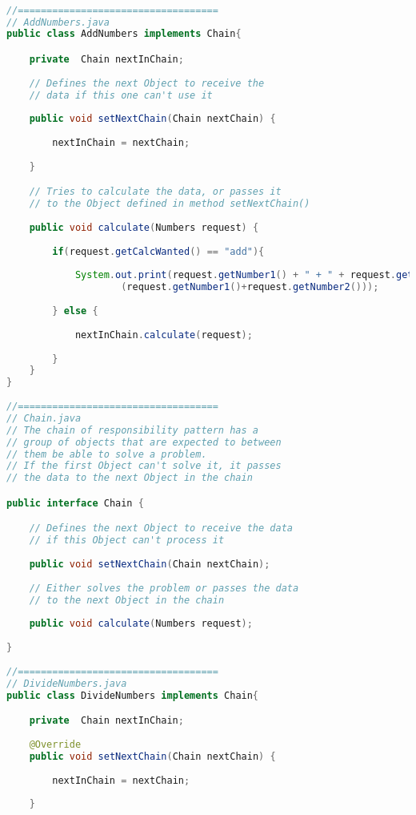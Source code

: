 \documentclass[10pt , a4paper]{article}
\begin{document}
\small
\begin{lstlisting}[language=java]

//===================================
// AddNumbers.java
public class AddNumbers implements Chain{

	private  Chain nextInChain;
	
	// Defines the next Object to receive the
	// data if this one can't use it
	
	public void setNextChain(Chain nextChain) {
		
		nextInChain = nextChain;
		
	}

	// Tries to calculate the data, or passes it
	// to the Object defined in method setNextChain()
	
	public void calculate(Numbers request) {
		
		if(request.getCalcWanted() == "add"){
			
			System.out.print(request.getNumber1() + " + " + request.getNumber2() + " = "+
					(request.getNumber1()+request.getNumber2()));
			
		} else {
			
			nextInChain.calculate(request);
			
		}	
	}
}
 
//===================================
// Chain.java
// The chain of responsibility pattern has a 
// group of objects that are expected to between
// them be able to solve a problem. 
// If the first Object can't solve it, it passes
// the data to the next Object in the chain

public interface Chain {

	// Defines the next Object to receive the data
	// if this Object can't process it
	
	public void setNextChain(Chain nextChain);
	
	// Either solves the problem or passes the data
	// to the next Object in the chain
	
	public void calculate(Numbers request);
	
}
 
//===================================
// DivideNumbers.java
public class DivideNumbers implements Chain{

	private  Chain nextInChain;
	
	@Override
	public void setNextChain(Chain nextChain) {
		
		nextInChain = nextChain;
		
	}


\end{lstlisting}
\end{document}
